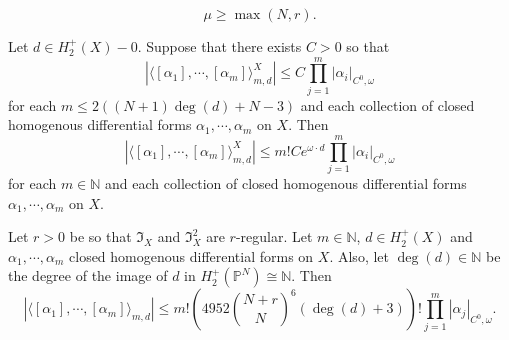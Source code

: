 \documentclass[10pt,a4paper]{amsart}
\newcommand{\bN}{\mathbb{N}}
\newcommand{\bP}{\mathbb{P}}
\newcommand{\frI}{\mathfrak{I}}
\renewcommand{\geq}{\geqslant}
\renewcommand{\leq}{\leqslant}
\begin{document}
	\begin{equation} \label{eqnmuinequality}
		\mu \geq \max(N,r).
	\end{equation}

\begin{lemma} \label{lemmamainargumentstuffesf}
	Let $d \in H_2^+(X)-0$.
	Suppose that there exists $C>0$ so that
	\begin{equation} \label{eqnaefaef20}
		\left|\langle [\alpha_1],\cdots,[\alpha_m] \rangle^X_{m,d} \right| \leq C \prod_{j=1}^m |\alpha_i|_{C^0,\omega}
	\end{equation}
	for each $m \leq 2((N+1)\deg(d)+ N-3)$ and each collection of closed homogenous differential forms $\alpha_1,\cdots,\alpha_m$ on $X$.
	Then
	\begin{equation} \label{eqnaefaef2}
		\left|\langle [\alpha_1],\cdots,[\alpha_m] \rangle^X_{m,d} \right| \leq m! C e^{\omega \cdot d} \prod_{j=1}^m |\alpha_i|_{C^0,\omega}
	\end{equation}
	for each $m \in \bN$ and each collection of closed homogenous differential forms $\alpha_1,\cdots,\alpha_m$ on $X$.
\end{lemma}

\begin{theorem} \label{theoremproperestimates}
	Let $r>0$ be so that $\frI_X$ and $\frI_X^2$ are $r$-regular.
	Let $m \in \bN$, $d \in H_2^+(X)$ and $\alpha_1,\cdots,\alpha_m$ closed homogenous differential forms on $X$.
	Also, let $\deg(d) \in \bN$
	be the degree of the image of $d$ in $H_2^+(\bP^N) \cong \bN$.
	Then
	\begin{equation}
		\left|\langle [\alpha_1],\cdots,[\alpha_m] \rangle_{m,d} \right| \leq
		m!\left(4952{N+r \choose N}^6(\deg(d)+3)\right)!
		\prod_{j=1}^m |\alpha_j|_{C^0,\omega}.
	\end{equation}
\end{theorem}
\end{document}
